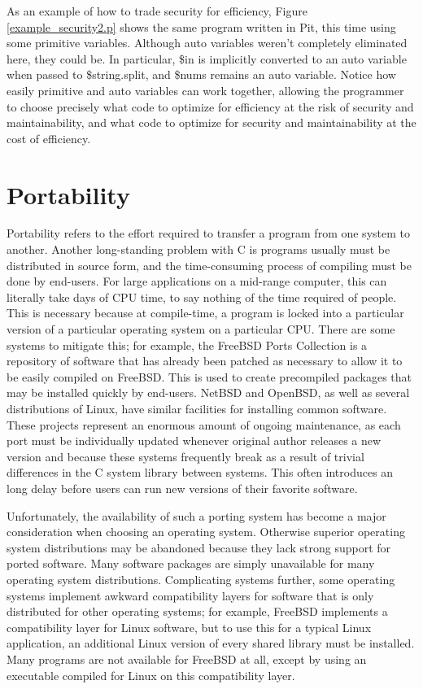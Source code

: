 As an example of how to trade security for efficiency, Figure \ref{example_security2.p} shows the same program written in
Pit, this time using some primitive variables.  Although auto variables weren't completely eliminated here, they could be.  In
particular, \$in is implicitly converted to an auto variable when passed to \$string.split, and \$nums remains an auto variable.  Notice
how easily primitive and auto variables can work together, allowing the programmer to choose precisely what code to optimize
for efficiency at the risk of security and maintainability, and what code to optimize for security and maintainability
at the cost of efficiency.


\section{Portability}

Portability refers to the effort required to transfer a program from one system to another.  Another long-standing
problem with C is programs usually must be distributed in source form, and the time-consuming process of compiling must
be done by end-users.  For large applications on a mid-range computer, this can literally take days of CPU time, to say
nothing of the time required of people.  This is necessary because at compile-time, a program is locked into a particular
version of a particular operating system on a particular CPU.  There are some systems to mitigate this; for example,
the FreeBSD Ports Collection\cite{freebsd-ports} is a repository of software that has already been patched as necessary
to allow it to be easily compiled on FreeBSD.  This is used to create precompiled packages that may be installed
quickly by end-users.  NetBSD and OpenBSD, as well as several distributions of Linux, have similar facilities for
installing common software.  These projects represent an enormous amount of ongoing maintenance, as each port must be
individually updated whenever original author releases a new version and because these systems frequently break as a
result of trivial differences in the C system library between systems.  This often introduces an long delay
before users can run new versions of their favorite software.

Unfortunately, the availability of such a porting system has become a major consideration
when choosing an operating system.  Otherwise superior operating system distributions may be abandoned because
they lack strong support for ported software.  Many software packages are simply unavailable for many operating system
distributions.  Complicating systems further, some operating systems implement awkward compatibility layers for
software that is only distributed for other operating systems; for example, FreeBSD implements a compatibility layer
for Linux software, but to use this for a typical Linux application, an additional Linux version of every shared
library must be installed.  Many programs are not available for FreeBSD at all, except by using an executable compiled
for Linux on this compatibility layer.

